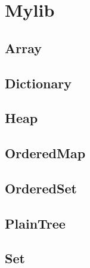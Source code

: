 \section*{Mylib}


\subsection*{Array}

\subsection*{Dictionary}

\subsection*{Heap}

\subsection*{OrderedMap}

\subsection*{OrderedSet}

\subsection*{PlainTree}

\subsection*{Set}







